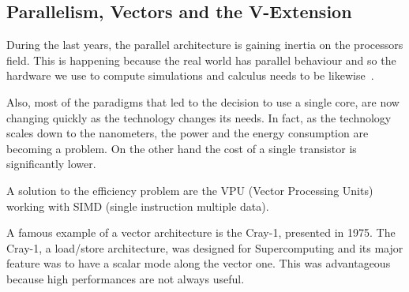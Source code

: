 \subsection{Parallelism, Vectors and the V-Extension}
During the last years, the parallel architecture is gaining inertia on the processors field. This is happening because the real world has parallel behaviour and so the hardware we use to compute simulations and calculus needs to be likewise~\cite{Parallel-Computing}.

Also, most of the paradigms that led to the decision to use a single core, are now changing quickly as the technology changes its needs.
In fact, as the technology scales down to the nanometers, the power and the energy consumption are becoming a problem. On the other hand the cost of a single transistor is significantly lower.


A solution to the efficiency problem are the VPU (Vector Processing Units) working with SIMD (single instruction multiple data).

A famous example of a vector architecture is the Cray-1, presented in 1975.
The Cray-1, a load/store architecture, was designed for Supercomputing and its major feature was to have a scalar mode along the vector one. This was advantageous because high performances are not always useful.

